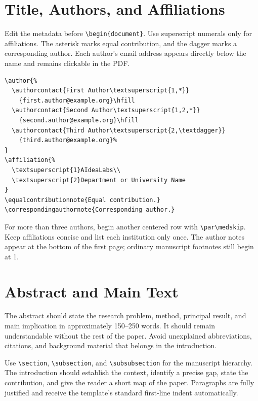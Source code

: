 \documentclass{templates/aidealabs-paper}
\begin{document}
\section{Title, Authors, and Affiliations}
\label{sec:authors}

Edit the metadata before \verb|\begin{document}|. Use superscript numerals only for affiliations. The asterisk marks equal contribution, and the dagger marks a corresponding author. Each author's email address appears directly below the name and remains clickable in the PDF.

\begin{Verbatim}[fontsize=\small]
\author{%
  \authorcontact{First Author\textsuperscript{1,*}}
    {first.author@example.org}\hfill
  \authorcontact{Second Author\textsuperscript{1,2,*}}
    {second.author@example.org}\hfill
  \authorcontact{Third Author\textsuperscript{2,\textdagger}}
    {third.author@example.org}%
}
\affiliation{%
  \textsuperscript{1}AIdeaLabs\\
  \textsuperscript{2}Department or University Name
}
\equalcontributionnote{Equal contribution.}
\correspondingauthornote{Corresponding author.}
\end{Verbatim}

For more than three authors, begin another centered row with \verb|\par\medskip|. Keep affiliations concise and list each institution only once. The author notes appear at the bottom of the first page; ordinary manuscript footnotes still begin at 1.

\section{Abstract and Main Text}
\label{sec:writing}

The abstract should state the research problem, method, principal result, and main implication in approximately 150--250 words. It should remain understandable without the rest of the paper. Avoid unexplained abbreviations, citations, and background material that belongs in the introduction.

Use \verb|\section|, \verb|\subsection|, and \verb|\subsubsection| for the manuscript hierarchy. The introduction should establish the context, identify a precise gap, state the contribution, and give the reader a short map of the paper. Paragraphs are fully justified and receive the template's standard first-line indent automatically.
\end{document}
